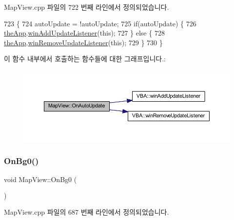 Map\+View.\+cpp 파일의 722 번째 라인에서 정의되었습니다.


\begin{DoxyCode}
723 \{
724   autoUpdate = !autoUpdate;
725   \textcolor{keywordflow}{if}(autoUpdate) \{
726     \mbox{\hyperlink{_v_b_a_8cpp_a8095a9d06b37a7efe3723f3218ad8fb3}{theApp}}.\mbox{\hyperlink{class_v_b_a_af0712f70a90d023ab8327a366be08174}{winAddUpdateListener}}(\textcolor{keyword}{this});
727   \} \textcolor{keywordflow}{else} \{
728     \mbox{\hyperlink{_v_b_a_8cpp_a8095a9d06b37a7efe3723f3218ad8fb3}{theApp}}.\mbox{\hyperlink{class_v_b_a_a2d31a0656df2230310aa8dc9e3a735d3}{winRemoveUpdateListener}}(\textcolor{keyword}{this});    
729   \}
730 \}
\end{DoxyCode}
이 함수 내부에서 호출하는 함수들에 대한 그래프입니다.\+:
\nopagebreak
\begin{figure}[H]
\begin{center}
\leavevmode
\includegraphics[width=350pt]{class_map_view_ace8d1802d7e8ae5bd92e572b9c0c84df_cgraph}
\end{center}
\end{figure}
\mbox{\label{class_map_view_a63d587842197ce259cfcf9cfd29d0771}} 
\subsubsection{\texorpdfstring{On\+Bg0()}{OnBg0()}}
{\footnotesize\ttfamily void Map\+View\+::\+On\+Bg0 (\begin{DoxyParamCaption}{ }\end{DoxyParamCaption})\hspace{0.3cm}{\ttfamily [protected]}}



Map\+View.\+cpp 파일의 687 번째 라인에서 정의되었습니다.


